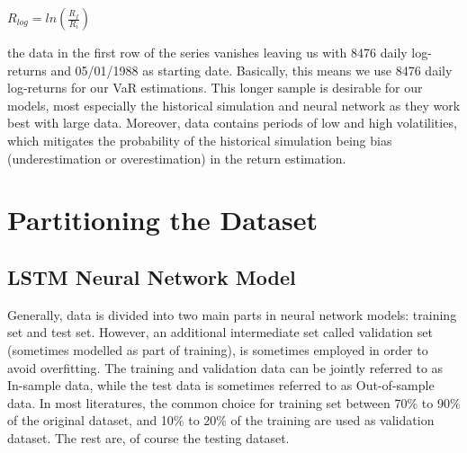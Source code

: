 \documentclass[a4paper,11pt,oneside]{book}
\begin{document}
\begin{center}
	$R_{log} = ln(\frac{R_f}{R_i})$
\end{center}
the data in the first row of the series vanishes leaving us with 8476 daily log-returns and 05/01/1988 as starting date. Basically, this means we use 8476 daily log-returns for our VaR estimations. This longer sample is desirable for our models, most especially the historical simulation and neural network as they work best with large data. Moreover, data contains periods of low and high volatilities, which mitigates the probability of the historical simulation being bias (underestimation or overestimation) in the return estimation.\newline

\section{Partitioning the Dataset}
\subsection{LSTM Neural Network Model}

Generally, data is divided into two main parts in neural network models: training set and test set. However, an additional intermediate set called validation set (sometimes modelled as part of training), is sometimes employed in order to avoid overfitting. The training and validation data can be jointly referred to as In-sample data, while the test data is sometimes referred to as Out-of-sample data. In most literatures, the common choice for training set between 70\% to 90\% of the original dataset, and 10\% to 20\% of the training are used as validation dataset. The rest are, of course the testing dataset. \newline\newline
\end{document}
